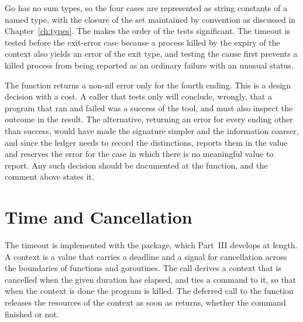 Go has no sum types, so the four cases are represented as string constants of a named type, with the closure of the set maintained by convention as discussed in Chapter~\ref{ch:types}. The  makes the order of the tests significant. The timeout is tested before the exit-error case because a process killed by the expiry of the context also yields an error of the exit type, and testing the cause first prevents a killed process from being reported as an ordinary failure with an unusual status.

The function returns a non-nil error only for the fourth ending. This is a design decision with a cost. A caller that tests only  will conclude, wrongly, that a program that ran and failed was a success of the tool, and must also inspect the outcome in the result. The alternative, returning an error for every ending other than success, would have made the signature simpler and the information coarser, and since the ledger needs to record the distinctions,  reports them in the value and reserves the error for the case in which there is no meaningful value to report. Any such decision should be documented at the function, and the comment above  states it.

\section{Time and Cancellation}

The timeout is implemented with the  package, which Part~III develops at length. A context is a value that carries a deadline and a signal for cancellation across the boundaries of functions and goroutines. The call  derives a context that is cancelled when the given duration has elapsed, and  ties a command to it, so that when the context is done the program is killed. The deferred call to the  function releases the resources of the context as soon as  returns, whether the command finished or not.


